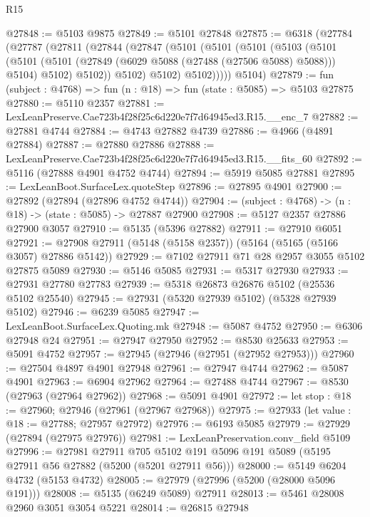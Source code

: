 \begin{lexlean}{R15}
\begin{coremodule}
{{{{{{{{{{{@27848 := @5103 @9875
@27849 := @5101 @27848
@27875 := @6318
    (@27784
      (@27787
        (@27811
          (@27844
            (@27847
              (@5101
                (@5101
                  (@5101
                    (@5103
                      (@5101
                        (@5101
                          (@5101 (@27849 (@6029 @5088 (@27488 (@27506 @5088) @5088))) @5104)
                          @5102)
                        @5102))
                    @5102)
                  @5102)
                @5102)))))
      @5104)
@27879 := fun (subject : @4768) => fun (n : @18) => fun (state : @5085) => @5103 @27875
@27880 := @5110 @2357
@27881 := LexLeanPreserve.Cae723b4f28f25c6d220e7f7d64945ed3.R15.__enc_7
@27882 := @27881 @4744
@27884 := @4743 @27882 @4739
@27886 := @4966 (@4891 @27884)
@27887 := @27880 @27886
@27888 := LexLeanPreserve.Cae723b4f28f25c6d220e7f7d64945ed3.R15.__fits_60
@27892 := @5116 (@27888 @4901 @4752 @4744)
@27894 := @5919 @5085 @27881
@27895 := LexLeanBoot.SurfaceLex.quoteStep
@27896 := @27895 @4901
@27900 := @27892 (@27894 (@27896 @4752 @4744))
@27904 := (subject : @4768) -> (n : @18) -> (state : @5085) -> @27887 @27900
@27908 := @5127 @2357 @27886 @27900 @3057
@27910 := @5135 (@5396 @27882)
@27911 := @27910 @6051
@27921 := @27908 @27911 (@5148 (@5158 @2357)) (@5164 (@5165 (@5166 @3057) @27886 @5142))
@27929 := @7102 @27911 @71 @28 @2957 @3055 @5102 @27875 @5089
@27930 := @5146 @5085
@27931 := @5317 @27930
@27933 := @27931 @27780 @27783
@27939 := @5318 @26873 @26876 @5102 (@25536 @5102 @25540)
@27945 := @27931 (@5320 @27939 @5102) (@5328 @27939 @5102)
@27946 := @6239 @5085
@27947 := LexLeanBoot.SurfaceLex.Quoting.mk
@27948 := @5087 @4752
@27950 := @6306 @27948 @24
@27951 := @27947 @27950
@27952 := @8530 @25633
@27953 := @5091 @4752
@27957 := @27945 (@27946 (@27951 (@27952 @27953)))
@27960 := @27504 @4897 @4901 @27948
@27961 := @27947 @4744
@27962 := @5087 @4901
@27963 := @6904 @27962
@27964 := @27488 @4744
@27967 := @8530 (@27963 (@27964 @27962))
@27968 := @5091 @4901
@27972 := let stop : @18 := @27960; @27946 (@27961 (@27967 @27968))
@27975 := @27933 (let value : @18 := @27788; @27957 @27972)
@27976 := @6193 @5085
@27979 := @27929 (@27894 (@27975 @27976))
@27981 := LexLeanPreservation.conv_field @5109
@27996 := @27981
    @27911
    @705
    @5102
    @191
    @5096
    @191
    @5089
    (@5195 @27911 @56 @27882 (@5200 (@5201 @27911 @56)))
@28000 := @5149 @6204 @4732 (@5153 @4732)
@28005 := @27979 (@27996 (@5200 (@28000 @5096 @191)))
@28008 := @5135 (@6249 @5089) @27911
@28013 := @5461 @28008 @2960 @3051 @3054 @5221
@28014 := @26815 @27948
}}}}}}}}}}}
\end{coremodule}
\end{lexlean}
